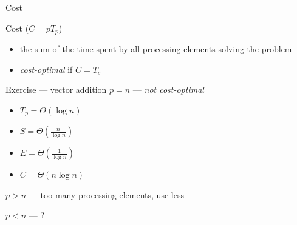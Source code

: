 \documentclass[10pt, t]{beamer}
\begin{document}
  \begin{frame}{Cost}
    \begin{block}{Cost ($C=pT_p$)}
      \begin{itemize}
        \item the sum of the time spent by all processing elements solving the
          problem
        \item \emph{cost-optimal} if $C=T_s$
      \end{itemize}
    \end{block}

    \vspace{-2ex}
    \begin{center}
    \end{center}
  \end{frame}

  \begin{frame}{Exercise --- vector addition}
    $p=n$ --- \emph{not cost-optimal}
    \begin{itemize}
      \item $T_p=\Theta(\log n)$
      \item $S=\Theta(\frac{n}{\log n})$
      \item $E=\Theta(\frac{1}{\log n})$
      \item $C=\Theta(n\log n)$
    \end{itemize}

    $p>n$ --- too many processing elements, use less

    $p<n$ --- ?
  \end{frame}
\end{document}
